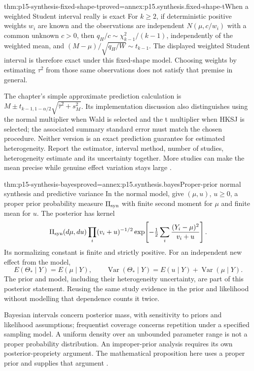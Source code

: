 \begin{hbtheorem}{thm:p15-synthesis-fixed-shape-t}{proved=annex:p15.synthesis.fixed-shape-t}{When a weighted Student interval really is exact}
For \(k\geq2\), if deterministic positive weights \(w_i\) are known and the observations
are independent \(N(\mu,c/w_i)\) with a common unknown \(c>0\),
then \(q_H/c\sim\chi^2_{k-1}/(k-1)\), independently of the weighted
mean, and \((M-\mu)/\sqrt{q_H/W}\sim t_{k-1}\). The displayed
weighted Student interval is therefore exact under this fixed-shape model.
Choosing weights by estimating \(\tau^2\) from those same observations
does not satisfy that premise in general.
\end{hbtheorem}

The chapter's simple approximate prediction calculation is
\(M\pm t_{k-1,1-\alpha/2}\sqrt{\widehat\tau^2+s_M^2}\).
Its implementation discussion also distinguishes using the normal multiplier
when Wald is selected and the t multiplier when HKSJ is selected; the associated
summary standard error must match the chosen procedure. Neither version is
an exact prediction guarantee for estimated heterogeneity. Report the
estimator, interval method, number of studies, heterogeneity estimate and its
uncertainty together. More studies can make the mean precise while genuine
effect variation stays large \cite[secs.~10.10.4.2--10.10.4.5]{DeeksEtAl2024Cochrane10}.

\begin{hbtheorem}{thm:p15-synthesis-bayes}{proved=annex:p15.synthesis.bayes}{Proper-prior normal synthesis and predictive variance}
In the normal model, give \((\mu,u)\), \(u\geq0\), a proper
prior probability measure \(\Pi_{\rm syn}\) with finite second moment for \(\mu\) and finite
mean for \(u\). The posterior has kernel
\[
 \Pi_{\rm syn}(d\mu,du)\prod_i(v_i+u)^{-1/2}
       \exp\!\left[-\tfrac12\sum_i{(Y_i-\mu)^2\over v_i+u}\right].
\]
Its normalizing constant is finite and strictly positive. For an independent
new effect from the model,
\[
 E(\Theta_*\mid Y)=E(\mu\mid Y),\qquad
 \operatorname{Var}(\Theta_*\mid Y)
    =E(u\mid Y)+\operatorname{Var}(\mu\mid Y).
\]
The prior and model, including their heterogeneity uncertainty, are part of
this posterior statement. Reusing the same study evidence in the prior and
likelihood without modelling that dependence counts it twice.
\end{hbtheorem}

Bayesian intervals concern posterior mass, with sensitivity to priors and
likelihood assumptions; frequentist coverage concerns repetition under a
specified sampling model. A uniform density over an unbounded parameter
range is not a proper probability distribution. An improper-prior analysis
requires its own posterior-propriety argument. The mathematical proposition
here uses a proper prior and supplies that argument
\cite[sec.~10.13]{DeeksEtAl2024Cochrane10}.

